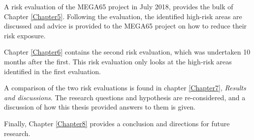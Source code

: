 A risk evaluation of the MEGA65 project in July 2018, provides the bulk of Chapter \ref{Chapter5}. Following the evaluation, the identified high-risk areas are discussed and advice is provided to the MEGA65 project on how to reduce their risk exposure. 

Chapter \ref{Chapter6} contains the second risk evaluation, which was undertaken 10 months after the first. This risk evaluation only looks at the high-risk areas identified in the first evaluation.

A comparison of the two risk evaluations is found in chapter \ref{Chapter7}, \textit{Results and discussions}. The research questions and hypothesis are re-considered, and a discussion of how this thesis provided answers to them is given.

Finally, Chapter \ref{Chapter8} provides a conclusion and directions for future research.
